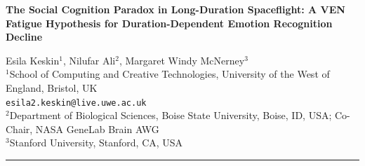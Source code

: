 \documentclass[11pt]{article}
\begin{document}
\begin{center}
{\LARGE\bfseries The Social Cognition Paradox in Long-Duration Spaceflight:
A VEN Fatigue Hypothesis for Duration-Dependent Emotion Recognition
Decline\par}

\vspace{1em}
{\large Esila Keskin$^{1}$, Nilufar Ali$^{2}$, Margaret Windy McNerney$^{3}$}\\[6pt]
{\small
$^{1}$School of Computing and Creative Technologies,
University of the West of England, Bristol, UK\\
\texttt{esila2.keskin@live.uwe.ac.uk}\\[3pt]
$^{2}$Department of Biological Sciences, Boise State University, Boise, ID, USA;
Co-Chair, NASA GeneLab Brain AWG\\[3pt]
$^{3}$Stanford University, Stanford, CA, USA}
\vspace{1.5em}
\end{center}

\noindent\rule{\linewidth}{0.5pt}
\vspace{0.5em}
\end{document}

